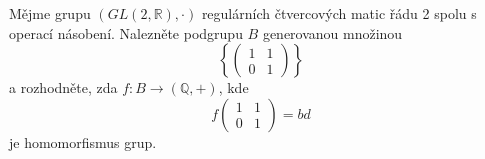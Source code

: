 Mějme grupu $(GL(2,\mathbb{R}), \cdot)$ regulárních čtvercových matic řádu 2
spolu s operací násobení. Nalezněte podgrupu $B$ generovanou množinou 
$$\left \{ \begin{pmatrix}
 1& 1\\ 
 0&1 
\end{pmatrix} \right \}$$
a rozhodněte, zda $f:B \rightarrow (\mathbb{Q}, +)$, kde 
$$f\begin{pmatrix}
 1& 1\\ 
 0&1 
\end{pmatrix} =bd$$ je homomorfismus grup.
